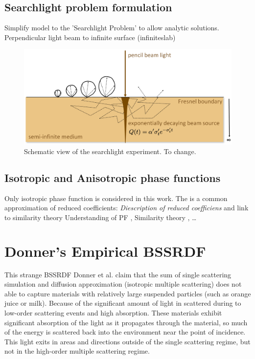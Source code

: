 \subsection{Searchlight problem formulation}
Simplify model to the 'Searchlight Problem' to allow analytic solutions.
Perpendicular light beam to infinite surface \cite{Jacques1995}
(\gls{infiniteslab}) \begin{figure}[h]
    \centering
    \includegraphics[width=\textwidth]{imgs/schemes/searchlight_disney}
    \caption{Schematic view of the searchlight experiment. To change.}
    \label{fig:searchlight_scheme}
\end{figure}

\subsection{Isotropic and Anisotropic phase functions}
\label{section:phasefunction_approximation}
Only isotropic phase function is considered in this work. The is a common approximation of reduced
coefficients:
\emph{Diescription of reduced coefficiens} and link to similarity theory
Understanding of PF \cite{Gkioulekas:2013:URP:2516971.2516972}, Similarity theory
\cite{Zhao:2014:HSR:2601097.2601104}, \cite{Gkioulekas:2013:IVR:2508363.2508377}
\ldots

\section{Donner's Empirical BSSRDF}
This strange \gls{BSSRDF}
Donner et al. \cite{Donner:2009:EBM} claim that the sum of single scattering
simulation and diffusion approximation (isotropic multiple scattering) does not
able to capture materials with relatively large suspended particles (such as
orange juice or milk). Because of the significant amount of light in scattered
during to low-order scattering events and high absorption.
These materials exhibit significant absorption of the light as it propagates
through the material, so much of the energy is scattered back into
the environment near the point of incidence. This light exits in areas and
directions outside of the single scattering regime, but not in the high-order
multiple scattering regime.


